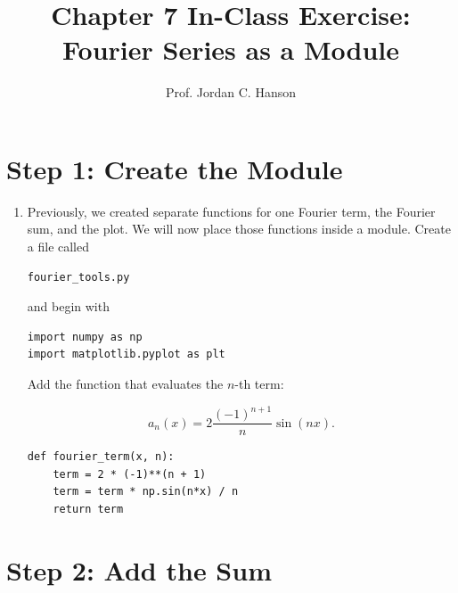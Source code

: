 \documentclass{article}
\begin{document}
\twocolumn

\title{Chapter 7 In-Class Exercise: Fourier Series as a Module}
\author{Prof. Jordan C. Hanson}
\date{}

\maketitle

\section{Step 1: Create the Module}

\begin{enumerate}

\item Previously, we created separate functions for one Fourier term, the Fourier sum, and the plot.  We will now place those functions inside a module. Create a file called

\begin{verbatim}
fourier_tools.py
\end{verbatim}

and begin with

\begin{verbatim}
import numpy as np
import matplotlib.pyplot as plt
\end{verbatim}

Add the function that evaluates the $n$-th term:

\[
a_n(x)=
2\frac{(-1)^{n+1}}{n}\sin(nx).
\]

\begin{verbatim}
def fourier_term(x, n):
    term = 2 * (-1)**(n + 1)
    term = term * np.sin(n*x) / n
    return term
\end{verbatim}

\end{enumerate}


\section{Step 2: Add the Sum}
\end{document}
